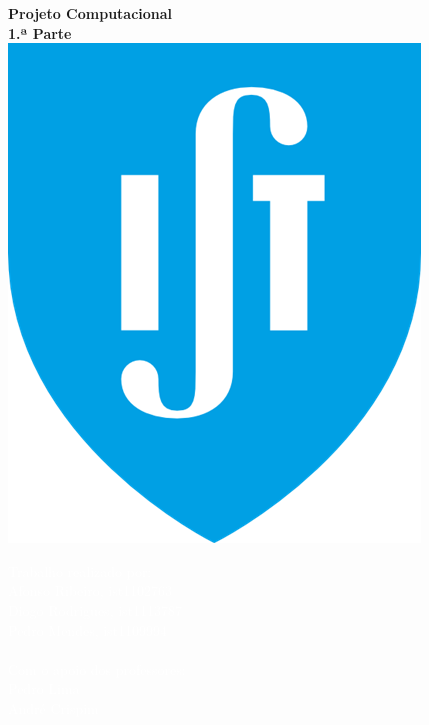 \documentclass[12pt,a4paper]{article}
\begin{document}
\begin{titlepage}
        \begin{spacing}{1.5}
        \begin{flushleft}
        {\Huge \textbf{Projeto Computacional}}\\ [10pt]
        {\huge  \textbf{1.ª Parte}}\\ [48pt]
        {\includegraphics[scale=0.40]{IST_Logo.png}} \\ [1.5cm]
        \end{flushleft}
        \end{spacing}
        \begin{minipage}{2cm}
        \end{minipage} 
        \vspace{6.4 cm}
        \begin{flushleft}
        
        \Large \textcolor{white}{
            Trabalho realizado por: \\
            Afonso Ribeiro, ist1102763 \\
            Diogo Rodrigues, ist1113787 \\
            Pedro Mendes, ist1109994 \\
            \vspace{0.5cm} \\
            Com o apoio dos professores: \\
            Pedro Lima \\
            André Crispim
        }
        \end{flushleft}
        \vspace{1cm}
     \end{titlepage}
\end{document}
